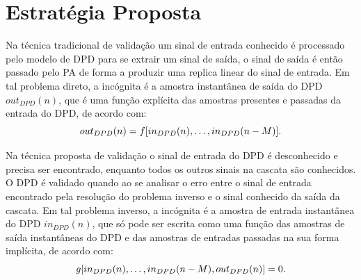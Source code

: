 
\section{Estratégia Proposta} \label{sec:estudoii-2}
Na técnica tradicional de validação um sinal de entrada conhecido é processado pelo modelo de DPD para se extrair um sinal de saída, o sinal de saída é então passado pelo PA de forma a produzir uma replica linear do sinal de entrada. Em tal problema direto, a incógnita é a amostra instantânea de saída do DPD $out_{DPD}(n)$, que é uma função explícita das amostras presentes e passadas da entrada do DPD, de acordo com:
\begin{equation}
\small out_{DPD}(n)=f[in_{DPD}(n),\ldots, in_{DPD}(n-M)].
\label{implicit_01}
\end{equation}

Na técnica proposta de validação o sinal de entrada do DPD é desconhecido e precisa ser encontrado, enquanto todos os outros sinais na cascata são conhecidos. O DPD é validado quando ao se analisar o erro entre o sinal de entrada encontrado pela resolução do problema inverso e o sinal conhecido da saída da cascata. Em tal problema inverso, a incógnita é a amostra de entrada instantânea do DPD $in_{DPD}(n)$, que só pode ser escrita como uma função das amostras de saída instantâneas do DPD e das amostras de entradas passadas na sua forma implícita, de acordo com:
\begin{equation}
\small g[in_{DPD}(n),\ldots, in_{DPD}(n-M), out_{DPD}(n)]=0.
\label{implicit_02}
\end{equation}

